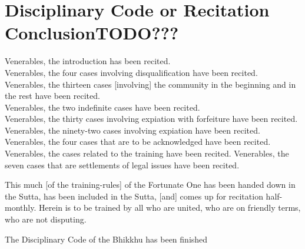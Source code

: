 \section{Disciplinary Code or Recitation ConclusionTODO???}
\label{conclusion}

Venerables, the introduction has been recited.\\
Venerables, the four cases involving disqualification have been recited.\\
Venerables, the thirteen cases [involving] the community in the beginning and in the rest have been recited.\\
Venerables, the two indefinite cases have been recited.\\
Venerables, the thirty cases involving expiation with forfeiture have been recited.\\
Venerables, the ninety-two cases involving expiation have been recited.\\
Venerables, the four cases that are to be acknowledged have been recited.\\
Venerables, the cases related to the training have been recited. Venerables, the seven cases that are settlements of legal issues have been recited.

This much [of the training-rules] of the Fortunate One has been handed down in the Sutta, has been included in the Sutta, [and] comes up for recitation half-monthly. Herein is to be trained by all who are united, who are on friendly terms, who are not disputing.

\begin{outro}
  The Disciplinary Code of the Bhikkhu has been finished
\end{outro}

\clearpage
